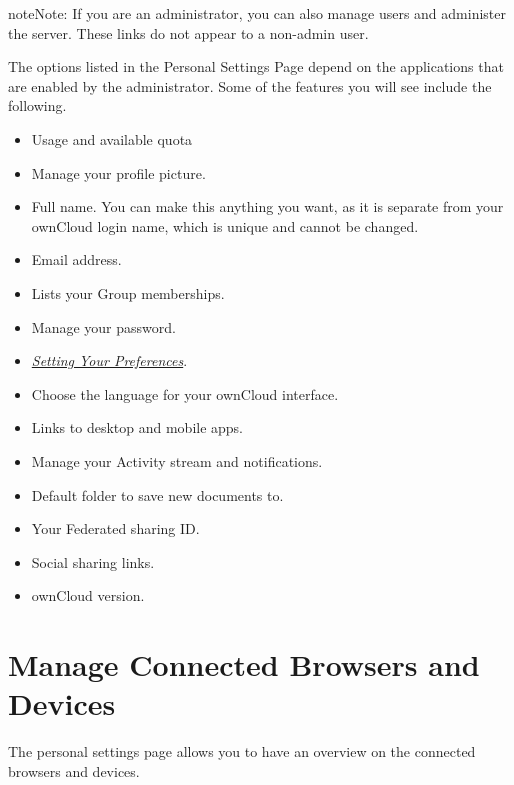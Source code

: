 \documentclass[letterpaper,10pt,english]{sphinxmanual}
\begin{document}
\begin{notice}{note}{Note:}
If you are an administrator, you can also manage users and administer
the server. These links do not appear to a non-admin user.
\end{notice}

The options listed in the Personal Settings Page depend on the applications that
are enabled by the administrator.  Some of the features you will see
include the following.
\begin{itemize}
\item {} 
Usage and available quota

\item {} 
Manage your profile picture.

\item {} 
Full name. You can make this anything you want, as it is separate from your
ownCloud login name, which is unique and cannot be changed.

\item {} 
Email address.

\item {} 
Lists your Group memberships.

\item {} 
Manage your password.

\item {} 
{\hyperref[userpreferences::doc]{\emph{Setting Your Preferences}}}.

\item {} 
Choose the language for your ownCloud interface.

\item {} 
Links to desktop and mobile apps.

\item {} 
Manage your Activity stream and notifications.

\item {} 
Default folder to save new documents to.

\item {} 
Your Federated sharing ID.

\item {} 
Social sharing links.

\item {} 
ownCloud version.

\end{itemize}


\chapter{Manage Connected Browsers and Devices}
\label{session_management:manage-connected-browsers-and-devices}\label{session_management::doc}
The personal settings page allows you to have an overview on the connected
browsers and devices.
\end{document}
